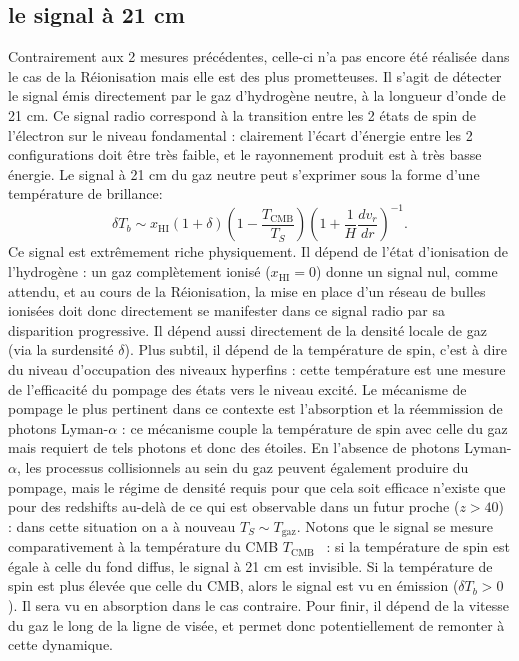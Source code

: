 \subsection{le signal à 21 cm}
 Contrairement aux 2 mesures précédentes, celle-ci n'a pas encore été réalisée dans le cas de la Réionisation mais elle est des plus prometteuses. Il s'agit de détecter le signal émis directement par le gaz d'hydrogène neutre, à la longueur d'onde de 21 cm. Ce signal radio correspond à la transition entre les 2 états de spin de l'électron sur le niveau fondamental : clairement l'écart d'énergie entre les 2 configurations doit être très faible, et le rayonnement produit est à très basse énergie. Le signal à 21 cm du gaz neutre peut s'exprimer sous la forme d'une température de brillance:
 \begin{equation}
 \delta T_b \sim x_\mathrm{HI} (1+\delta) (1-\frac{T_\mathrm{CMB}}{T_S})(1+\frac{1}{H}\frac{d v_r}{dr})^{-1}.
 \end{equation}
 Ce signal est extrêmement riche physiquement. Il dépend de l'état d'ionisation de l'hydrogène : un gaz complètement ionisé ($x_\mathrm{HI}=0$) donne un signal nul, comme attendu, et au cours de la Réionisation, la mise en place d'un réseau de bulles ionisées doit donc directement se manifester dans ce signal radio par sa disparition progressive. Il dépend aussi directement de la densité locale de gaz (via la surdensité $\delta$). Plus subtil, il dépend de la température de spin, c'est à dire du niveau d'occupation des niveaux hyperfins : cette température est une mesure de l'efficacité du pompage des états vers le niveau excité. Le mécanisme de pompage le plus pertinent dans ce contexte est l'absorption et la réemmission de photons Lyman-$\alpha$ : ce mécanisme couple la température de spin avec celle du gaz mais requiert de tels photons et donc des étoiles.  En l'absence de photons Lyman-$\alpha$, les processus collisionnels au sein du gaz peuvent également produire du pompage, mais le régime de densité requis pour que cela soit efficace n'existe que pour des redshifts au-delà de ce qui est observable dans un futur proche ($z>40$) : dans cette situation on a à nouveau $T_S\sim T_\mathrm{gaz}$. Notons que le signal se mesure comparativement à la température du CMB $T_\mathrm{CMB}$ ~: si la température de spin est égale à celle du fond diffus, le signal à 21 cm est invisible. Si la température de spin est plus élevée que celle du CMB, alors le signal est vu en émission ($\delta T_b >0$). Il sera vu en absorption dans le cas contraire. Pour finir, il dépend de la vitesse du gaz le long de la ligne de visée, et permet donc potentiellement de remonter à cette dynamique.


